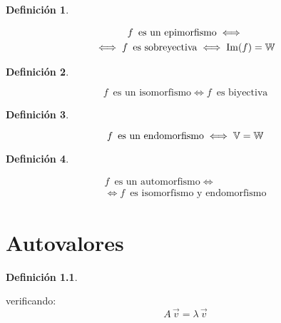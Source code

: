 \documentclass[a5paper,12pt,twoside]{book}
\newtheorem{defn}{{Definición}}[chapter]
\begin{document}
\begin{mdframed}[style=MyFrame1]
    \begin{defn}
    \end{defn}
    \begin{multline*}
        f \enspace \textrm{es un epimorfismo} \iff
        \\
        \iff f  \enspace \textrm{es sobreyectiva}
        \iff \operatorname{Im}(f) = \mathbb{W}
    \end{multline*}
\end{mdframed}

\begin{mdframed}[style=MyFrame1]
    \begin{defn}
    \end{defn}
    \begin{equation*}
        f \enspace \textrm{es un isomorfismo} \iff f \enspace \textrm{es biyectiva}
    \end{equation*}
\end{mdframed}

\begin{mdframed}[style=MyFrame1]
    \begin{defn}
    \end{defn}
    \begin{equation*}
        f \enspace \textrm{es un endomorfismo} \iff \mathbb{V} = \mathbb{W}
    \end{equation*}
\end{mdframed}

\begin{mdframed}[style=MyFrame1]
    \begin{defn}
    \end{defn}
    \begin{multline*}
        f \enspace \textrm{es un automorfismo} \iff
        \\
        \iff f \enspace \textrm{es isomorfismo y endomorfismo}
    \end{multline*}
\end{mdframed}


\chapter{Autovalores}

\begin{mdframed}[style=MyFrame1]
    \begin{defn}
        \label{defn:autovalor}
    \end{defn}
     verificando:
    \begin{equation*}
        A \, \Vec{v} = \lambda \, \Vec{v}
    \end{equation*}
\end{mdframed}
\end{document}
